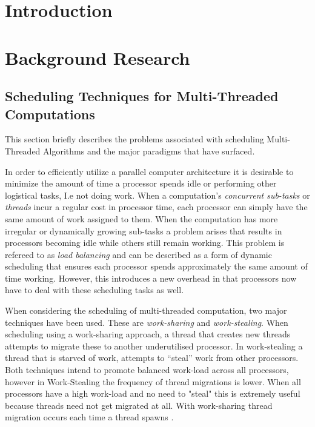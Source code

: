 \chapter{Introduction}

\chapter{Background Research}
\section{Scheduling Techniques for Multi-Threaded Computations}
This section briefly describes the problems associated with scheduling Multi-Threaded Algorithms and 
the major paradigms that have surfaced.

In order to efficiently utilize a parallel computer architecture it is desirable to minimize
the amount of time a processor spends idle or performing other logistical tasks, I.e not doing work. 
When a computation's \textit{concurrent sub-tasks} or \textit{threads} incur a regular cost in processor
time, each processor can simply have the same amount of work assigned to them. When the computation has
more irregular or dynamically growing sub-tasks a problem arises that results in 
processors becoming idle while others still remain working. This problem is refereed to as
\textit{load balancing} and can be described as a form of dynamic scheduling that ensures each processor 
spends approximately the same amount of time working. However, this introduces a new overhead in that 
processors now have to deal with these scheduling tasks as well. 

When considering the scheduling of multi-threaded computation, two major techniques have been used.
These are \textit{work-sharing} and \textit{work-stealing}.
When scheduling using a work-sharing approach, a thread that creates new threads
attempts to migrate these to another underutilised processor. In work-stealing a
thread that is starved of work, attempts to ``steal'' work from other processors. Both 
techniques intend to promote balanced work-load across all processors, however in Work-Stealing
the frequency of thread migrations is lower\cite[p.~2]{blumleis}. When all processors have a 
high work-load and no need to "steal" this is extremely useful because threads need not get 
migrated at all. With work-sharing thread migration occurs each time a thread spawns \cite[p.~2]{blumleis}.



